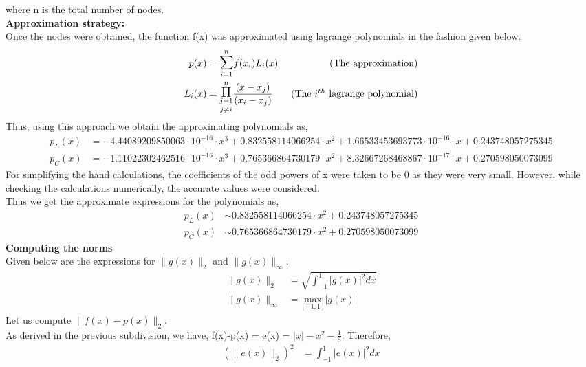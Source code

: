 \documentclass[letterpaper]{exam}
\begin{document}
\begin{questions}
\begin{parts}
\begin{solution}
 where n is the total number of nodes.
 \\
 \textbf{Approximation strategy:}\\
 Once the nodes were obtained, the function f(x) was approximated using lagrange polynomials in the fashion given below.
 \begin{align*}
 p(x) &= \overset{n}{\underset{i=1}{\mathlarger{\mathlarger{\sum}}}} f(x_i)L_i(x) &\mbox{ (The approximation)}\\
 L_i(x) &= \overset{n}{\underset{j \neq i}{\underset{j=1}{\mathlarger{\mathlarger{\Pi}}}}} \frac{(x - x_j)}{(x_i-x_j)} &\mbox{ (The $i^{th}$ lagrange polynomial)} 
 \end{align*}
 Thus, using this approach we obtain the approximating polynomials as,
 \begin{align*}
     p_L(x) &= -4.44089209850063\cdot 10^{-16}\cdot x^3 + 0.832558114066254 \cdot x^2 + 1.66533453693773\cdot 10^{-16} \cdot x + 0.243748057275345\\
     p_C(x) &= -1.11022302462516\cdot 10^{-16} \cdot x^3 + 0.765366864730179 \cdot x^2 + 8.32667268468867\cdot 10^{-17} \cdot x + 0.270598050073099
 \end{align*}
 For simplifying the hand calculations, the coefficients of the odd powers of x were taken to be 0 as they were very small. However, while checking the calculations numerically, the accurate values were considered.\\
 Thus we get the approximate expressions for the polynomials as,
 \begin{align*}
     p_L(x) &\sim  0.832558114066254 \cdot x^2  + 0.243748057275345\\
     p_C(x) &\sim  0.765366864730179 \cdot x^2 +  0.270598050073099
 \end{align*}
 \textbf{Computing the norms}\\
 Given below are the expressions for $\|g(x)\|_2$ and $\|g(x)\|_\infty$.
 \begin{align*}
    \|g(x)\|_2 &= \sqrt{\int_{-1}^{1} \left|g(x)\right|^2 dx} \\
    \|g(x)\|_\infty &= \underset{[-1,1]}{\text{max} } \left|g(x)\right|
 \end{align*}
 Let us compute $\|f(x) - p(x)\|_2$.\\
 As derived in the previous subdivision, we have,
 f(x)-p(x) = e(x) = $\left|x\right| - x^2 - \frac{1}{8}$.
 Therefore,
 \begin{align*}
     \left(\|e(x)\|_2\right)^2 &= \int_{-1}^{1} \left|e(x)\right|^2 dx\\

\end{align*}
\end{solution}
\end{parts}
\end{questions}
\end{document}
